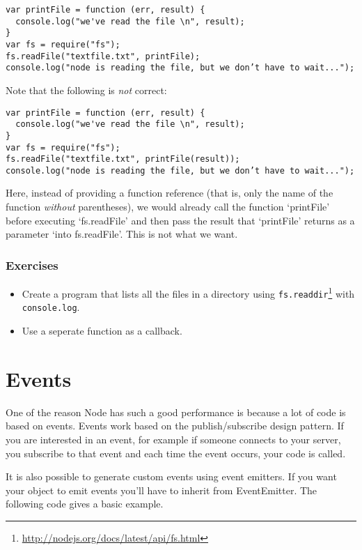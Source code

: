 \documentclass[a4paper]{report}
\begin{document}
\begin{lstlisting} 
var printFile = function (err, result) {
  console.log("we've read the file \n", result);
}
var fs = require("fs");
fs.readFile("textfile.txt", printFile);
console.log("node is reading the file, but we don’t have to wait...");
\end{lstlisting} 
 
\noindent Note that the following is \emph{not} correct: 
 
\begin{lstlisting} 
var printFile = function (err, result) {
  console.log("we've read the file \n", result);
}
var fs = require("fs");
fs.readFile("textfile.txt", printFile(result));
console.log("node is reading the file, but we don’t have to wait...");
\end{lstlisting} 
 
\noindent Here, instead of providing a function reference (that is, only the name of the function \emph{without} parentheses), we would already call the function `printFile' before executing `fs.readFile' and then pass the result that `printFile' returns as a parameter `into fs.readFile'. This is not what we want. 
 
\subsubsection*{Exercises} 
\begin{itemize} 
	\item Create a program that lists all the files in a directory using \texttt{fs.readdir}\footnote{\url{http://nodejs.org/docs/latest/api/fs.html}} with \texttt{console.log}. 
	\item Use a seperate function as a callback. 
\end{itemize} 
 
\section*{Events} 
One of the reason Node has such a good performance is because a lot of code is based on events. Events work based on the publish/subscribe design pattern. If you are interested in an event, for example if someone connects to your server, you subscribe to that event and each time the event occurs, your code is called. 
 
 
 
\noindent It is also possible to generate custom events using event emitters. If you want your object to emit events you'll have to inherit from EventEmitter. The following code gives a basic example. 
 
\end{document}
